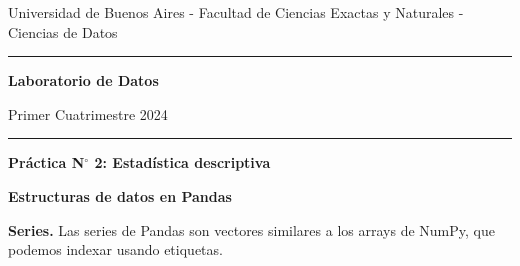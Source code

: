 \documentclass[a4paper,11pt]{article}
\theoremstyle{definition}
\begin{document}
\centerline{{\small Universidad de Buenos Aires - Facultad de Ciencias Exactas y Naturales - Ciencias de Datos}}

\vskip 0.2cm

\hrule

\vskip 0.2cm

 \centerline{{\bf\Large{\sc Laboratorio de Datos}}}

 \vskip 0.2cm

 \centerline{\ttfamily Primer Cuatrimestre 2024}

\vskip 0.2cm

 \hrule

 \bigskip
 \centerline{\bf Práctica N$^\circ$ 2: Estad\'istica descriptiva}
 \bigskip


\textbf{\large Estructuras de datos en Pandas}

\vspace{0.2cm}

\textbf{Series.} Las series de Pandas son vectores similares a los arrays de NumPy, que podemos indexar usando etiquetas.
\end{document}
